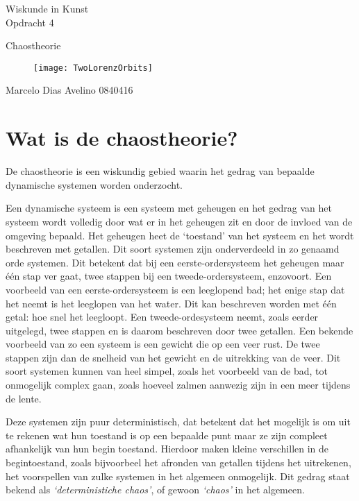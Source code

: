 \documentclass{article}
\begin{document}
\begin{center}
	\huge{Wiskunde in Kunst}\\
	\LARGE{Opdracht 4} \\
	
	\vspace{2cm}
	
	\Large{Chaostheorie}\\
	
	\vfill
	
	\begin{figure}[Hh]
		\centering
		\texttt{[image: TwoLorenzOrbits]}
		\label{}
	\end{figure}
	
	\vfill
	\Large{Marcelo Dias Avelino} \hfill \large{0840416}
\end{center}

\pagebreak

\section{Wat is de chaostheorie?}

De chaostheorie is een wiskundig gebied waarin het gedrag van bepaalde dynamische systemen worden onderzocht. 

Een dynamische systeem is een systeem met geheugen en het gedrag van het systeem wordt volledig door wat er in het geheugen zit en door de invloed van de omgeving bepaald. Het geheugen heet de `toestand' van het systeem en het wordt beschreven met getallen. Dit soort systemen zijn onderverdeeld in zo genaamd orde systemen. Dit betekent dat bij een eerste-ordersysteem het geheugen maar \'e\'en stap ver gaat, twee stappen bij een tweede-ordersysteem, enzovoort. Een voorbeeld van een eerste-ordersysteem is een leeglopend bad; het enige stap dat het neemt is het leeglopen van het water. Dit kan beschreven worden met \'e\'en getal: hoe snel het leegloopt. Een tweede-ordesysteem neemt, zoals eerder uitgelegd, twee stappen en is daarom beschreven door twee getallen. Een bekende voorbeeld van zo een systeem is een gewicht die op een veer rust. De twee stappen zijn dan de snelheid van het gewicht en de uitrekking van de veer. Dit soort systemen kunnen van heel simpel, zoals het voorbeeld van de bad, tot onmogelijk complex gaan, zoals hoeveel zalmen aanwezig zijn in een meer tijdens de lente. 

Deze systemen zijn puur deterministisch, dat betekent dat het mogelijk is om uit te rekenen wat hun toestand is op een bepaalde punt maar ze zijn compleet afhankelijk van hun begin toestand. Hierdoor maken kleine verschillen in de begintoestand, zoals bijvoorbeel het afronden van getallen tijdens het uitrekenen, het voorspellen van zulke systemen in het algemeen onmogelijk. Dit gedrag staat bekend als \textit{`deterministiche chaos'}, of gewoon \textit{`chaos'} in het algemeen. 
\end{document}
